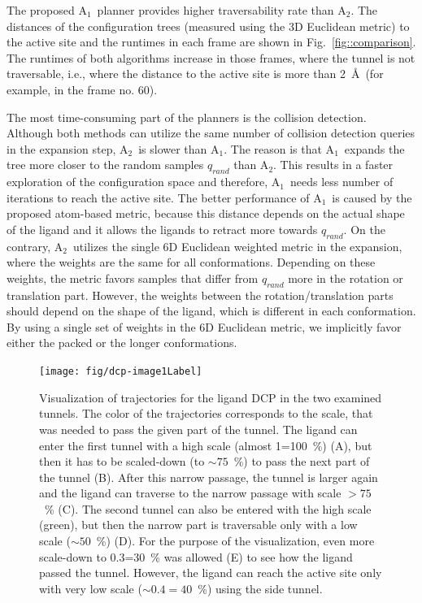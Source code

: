 \documentclass[usletter, 10pt, conference]{ieeeconf} %
\def\qrand{q_{rand}}
\def\RA{A$_{1}$}
\def\RB{A$_{2}$}
\begin{document}
{%

The proposed \RA\ planner provides higher traversability rate than \RB.
The distances of the configuration trees (measured using the 3D Euclidean metric) to the active site and the runtimes in each frame
are shown in Fig.~\ref{fig::comparison}.
The runtimes of both algorithms increase in those frames, where the tunnel is not traversable, i.e., where the distance
to the active site is more than 2~\AA\ (for example, in the frame no. 60).


The most time-consuming part of the planners is the collision detection. 
Although both methods can utilize the same number of collision detection queries in the expansion step, \RB\ is slower than \RA.
The reason is that \RA\ expands the tree more closer to the random samples $\qrand$ than \RB.
This results in a faster exploration of the configuration space and therefore, \RA\ needs less number of iterations to reach the active site.
The better performance of \RA\ is caused by the proposed atom-based metric, because this distance depends on the actual shape of the ligand and 
it allows the ligands to retract more towards $\qrand$.
On the contrary, \RB\ utilizes the single 6D Euclidean weighted metric in the expansion, where the weights are the same for all conformations.
Depending on these weights, the metric favors samples that differ from $\qrand$ more in the rotation or translation part.
However, the weights between the rotation/translation parts should depend on the shape of the ligand, which is different in each conformation.
By using a single set of weights in the 6D Euclidean metric, we implicitly favor either the packed or the longer conformations.



\begin{figure}
\centering
\texttt{[image: fig/dcp-image1Label]}\\
\caption{\label{fig::dcp}
    \small
Visualization of trajectories for the ligand DCP in the two examined tunnels.  
The color of the trajectories corresponds to the scale, that was needed to pass the given part of the tunnel.
The ligand can enter the first tunnel with a high scale (almost 1=100~\%) (A), but then it has to be scaled-down (to $\sim75$~\%) to pass the
next part of the tunnel (B). After this narrow passage, the tunnel is larger again and the ligand can traverse to the narrow passage with
scale $>75$~\% (C).
The second tunnel can also be entered with the high scale (green), but then the narrow part is traversable only with a low scale ($\sim50$~\%) (D). 
For the purpose of the visualization, even more scale-down to 0.3=30~\% was allowed (E) to see how the ligand passed the tunnel.
However, the ligand can reach the active site only with very low scale ($\sim0.4=40$~\%) using the side tunnel.
}
\end{figure}


}
\end{document}

